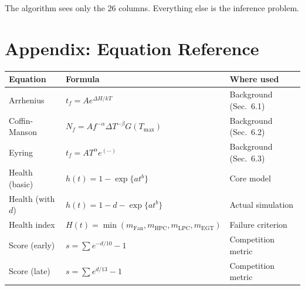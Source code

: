 \documentclass[11pt, a4paper]{article}
\begin{document}
The algorithm sees only the 26 columns. Everything else is
the inference problem.

\section*{Appendix: Equation Reference}

\begin{center}
\begin{tabular}{@{}lll@{}}
  \toprule
  Equation & Formula & Where used \\
  \midrule
  Arrhenius & $t_f = Ae^{\Delta H / kT}$ & Background (Sec.~6.1) \\
  Coffin-Manson & $N_f = Af^{-\alpha}\Delta T^{-\beta}G(T_{\max})$ & Background (Sec.~6.2) \\
  Eyring & $t_f = AT^{\alpha}e^{(\cdots)}$ & Background (Sec.~6.3) \\
  Health (basic) & $h(t) = 1 - \exp\{at^b\}$ & Core model \\
  Health (with $d$) & $h(t) = 1 - d - \exp\{at^b\}$ & Actual simulation \\
  Health index & $H(t) = \min(m_\text{Fan}, m_\text{HPC}, m_\text{LPC}, m_\text{EGT})$ & Failure criterion \\
  Score (early) & $s = \sum e^{-d/10} - 1$ & Competition metric \\
  Score (late) & $s = \sum e^{d/13} - 1$ & Competition metric \\
  \bottomrule
\end{tabular}
\end{center}

\end{document}
